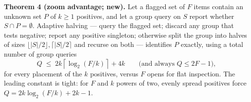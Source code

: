 \documentclass[11pt,a4paper]{article}
\begin{document}
\begin{thebox}
\textbf{Theorem 4 (zoom advantage; new).} Let a flagged set of $F$ items contain an unknown set $P$ of $k\ge1$ positives, and let a group query on $S$ report whether $S\cap P=\emptyset$. Adaptive halving --- query the flagged set; discard any group that tests negative; report any positive singleton; otherwise split the group into halves of sizes $\lfloor|S|/2\rfloor,\lceil|S|/2\rceil$ and recurse on both --- identifies $P$ exactly, using a total number of group queries
\[
Q \;\le\; 2k\left\lceil\log_2(F/k)\right\rceil + 4k
\qquad\text{(and always } Q\le 2F-1\text{)},
\]
for every placement of the $k$ positives, versus $F$ opens for flat inspection. The leading constant is tight: for $F$ and $k$ powers of two, evenly spread positives force $Q=2k\log_2(F/k)+2k-1$.
\end{thebox}
\end{document}
